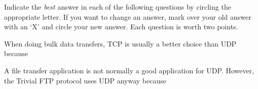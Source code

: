\documentclass[12pt]{examdesign}
\begin{document}
\begin{multiplechoice}[title={Multiple Choice}]
  
  Indicate the \emph{best} answer in each of the following questions by circling the appropriate
  letter. If you want to change an answer, mark over your old answer with an `X' and circle your
  new answer. Each question is worth two points.
  
%    

  \begin{question}
    When doing bulk data transfers, TCP is usually a better choice than UDP because

  \end{question}

%

  \begin{question}
    A file transfer application is not normally a good application for UDP. However, the Trivial
    FTP protocol uses UDP anyway because

  \end{question}


\end{multiplechoice}
\end{document}
